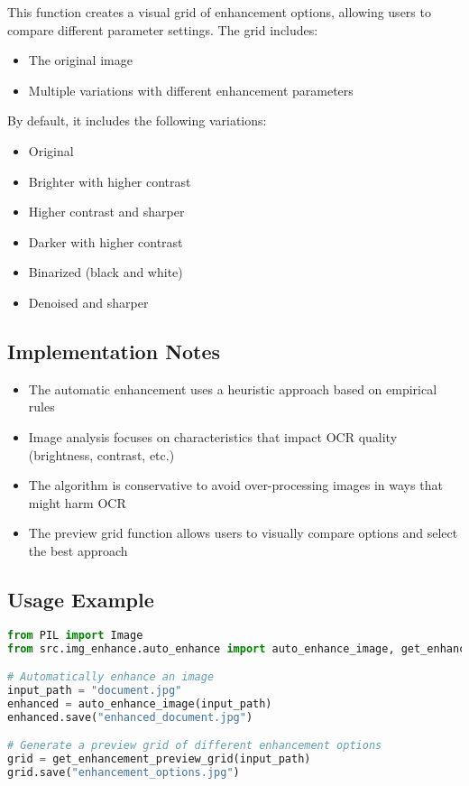 This function creates a visual grid of enhancement options, allowing users to compare different parameter settings. The grid includes:
\begin{itemize}
    \item The original image
    \item Multiple variations with different enhancement parameters
\end{itemize}

By default, it includes the following variations:
\begin{itemize}
    \item Original
    \item Brighter with higher contrast
    \item Higher contrast and sharper
    \item Darker with higher contrast
    \item Binarized (black and white)
    \item Denoised and sharper
\end{itemize}

\subsection{Implementation Notes}
\begin{itemize}
    \item The automatic enhancement uses a heuristic approach based on empirical rules
    \item Image analysis focuses on characteristics that impact OCR quality (brightness, contrast, etc.)
    \item The algorithm is conservative to avoid over-processing images in ways that might harm OCR
    \item The preview grid function allows users to visually compare options and select the best approach
\end{itemize}

\subsection{Usage Example}
\begin{lstlisting}[language=Python, caption=Example of Auto Enhancement]
from PIL import Image
from src.img_enhance.auto_enhance import auto_enhance_image, get_enhancement_preview_grid

# Automatically enhance an image
input_path = "document.jpg"
enhanced = auto_enhance_image(input_path)
enhanced.save("enhanced_document.jpg")

# Generate a preview grid of different enhancement options
grid = get_enhancement_preview_grid(input_path)
grid.save("enhancement_options.jpg")
\end{lstlisting}

